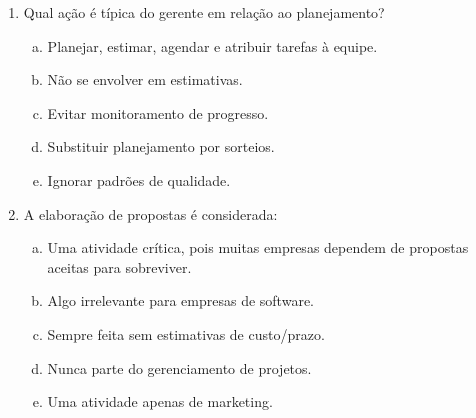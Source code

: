 \documentclass{beamer}
\begin{document}
\begin{frame}
    \begin{enumerate}
        \justifying
        \setcounter{enumi}{30}
        \item<1-2> Qual ação é típica do gerente em relação ao planejamento?
        \begin{enumerate}[a)]
            \justifying
            \item<1-2> \alert<2>{Planejar, estimar, agendar e atribuir tarefas à equipe}.
            \item<1-2> Não se envolver em estimativas.
            \item<1-2> Evitar monitoramento de progresso.
            \item<1-2> Substituir planejamento por sorteios.
            \item<1-2> Ignorar padrões de qualidade.
        \end{enumerate}
        \item<3-4> A elaboração de propostas é considerada:
        \begin{enumerate}[a)]
            \justifying
            \item<3-4> \alert<4>{Uma atividade crítica, pois muitas empresas dependem de propostas aceitas para sobreviver}.
            \item<3-4> Algo irrelevante para empresas de software.
            \item<3-4> Sempre feita sem estimativas de custo/prazo.
            \item<3-4> Nunca parte do gerenciamento de projetos.
            \item<3-4> Uma atividade apenas de marketing.
        \end{enumerate}
    \end{enumerate}
\end{frame}
\end{document}
